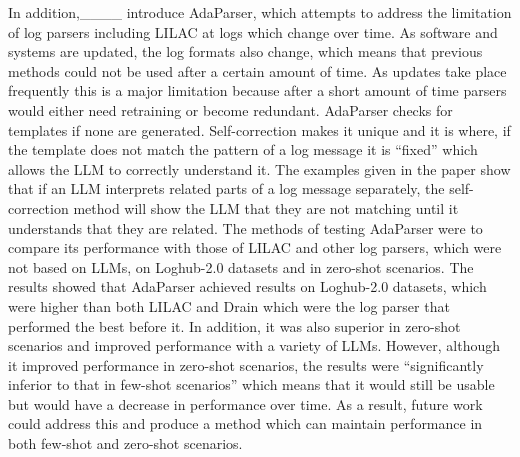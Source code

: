 In addition,____ introduce AdaParser, which attempts to address the limitation of log parsers including LILAC at logs which change over time. As software and systems are updated, the log formats also change, which means that previous methods could not be used after a certain amount of time. As updates take place frequently this is a major limitation because after a short amount of time parsers would either need retraining or become redundant. AdaParser checks for templates if none are generated. Self-correction makes it unique and it is where, if the template does not match the pattern of a log message it is ``fixed'' which allows the LLM to correctly understand it. The examples given in the paper show that if an LLM interprets related parts of a log message separately, the self-correction method will show the LLM that they are not matching until it understands that they are related. The methods of testing AdaParser were to compare its performance with those of LILAC and other log parsers, which were not based on LLMs, on Loghub-2.0 datasets and in zero-shot scenarios. The results showed that AdaParser achieved results on Loghub-2.0 datasets, which were higher than both LILAC and Drain which were the log parser that performed the best before it. In addition, it was also superior in zero-shot scenarios and improved performance with a variety of LLMs. However, although it improved performance in zero-shot scenarios, the results were ``significantly inferior to that in few-shot scenarios'' which means that it would still be usable but would have a decrease in performance over time. As a result, future work could address this and produce a method which can maintain performance in both few-shot and zero-shot scenarios. 

